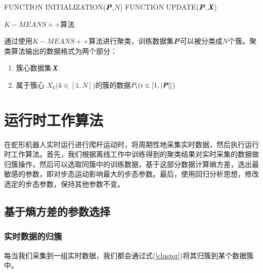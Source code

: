 \begin{algorithm}[h]
	FUNCTION INITIALIZATION($\textit{\textbf{P}}$,$N$) 
	FUNCTION UPDATE($\textit{\textbf{P}}$,$\textit{\textbf{X}}$) 
	
	\caption{$K-MEANS++$算法}
	\label{KMEANS++}
\end{algorithm}

通过使用$K-MEANS++$算法进行聚类，训练数据集$\textit{\textbf{P}}$可以被分类成$N$个簇。聚类算法输出的数据格式为两个部分：
\begin{enumerate}
	\item 簇心数据集$\textit{\textbf{X}}$.
	\item 属于簇心 $X_{k}(k \in [1,N]$)的簇的数据$P_{i}(i \in [1,\vert \textit{\textbf{P}} \vert]$)
\end{enumerate}

\section{运行时工作算法}

在蛇形机器人实时运行进行爬杆运动时，将周期性地采集实时数据，然后执行运行时工作算法。首先，我们根据离线工作中训练得到的聚类结果对实时采集的数据做归簇操作，然后可以选取同簇中的训练数据，基于这部分数据计算熵方差，选出最敏感的参数，即对步态运动影响最大的步态参数。最后，使用回归分析思想，修改选定的步态参数，保持其他参数不变。

\subsection{基于熵方差的参数选择}
\subsubsection{实时数据的归簇}
每当我们采集到一组实时数据，我们都会通过式(\ref{cluster})将其归簇到某个数据簇中。

